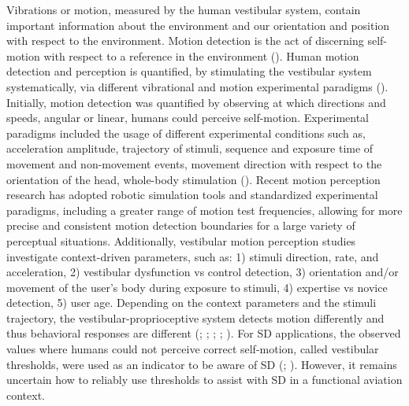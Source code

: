 \documentclass[11pt, onecolumn]{article}
\begin{document}
Vibrations or motion, measured by the human vestibular system, contain important information about the environment and our orientation and position with respect to the environment.  Motion detection is the act of discerning self-motion with respect to a reference in the environment (\cite{Chaudhuri_2013_Wholebody}).  Human motion detection and perception is quantified, by stimulating the vestibular system systematically, via different vibrational and motion experimental paradigms (\cite{Angelaki_2008_Vestibular}). Initially, motion detection was quantified by observing at which directions and speeds, angular or linear, humans could perceive self-motion.  Experimental paradigms included the usage of different experimental conditions such as, acceleration amplitude, trajectory of stimuli, sequence and exposure time of movement and non-movement events, movement direction with respect to the orientation of the head, whole-body stimulation (\cite{Melvill_1978_Vertical}).  Recent motion perception research has adopted robotic simulation tools and standardized experimental paradigms, including a greater range of motion test frequencies, allowing for more precise and consistent motion detection boundaries for a large variety of perceptual situations.  Additionally, vestibular motion perception studies investigate context-driven parameters, such as: 1) stimuli direction, rate, and acceleration, 2) vestibular dysfunction vs control detection, 3) orientation and/or movement of the user's body during exposure to stimuli, 4) expertise vs novice detection, 5) user age.  Depending on the context parameters and the stimuli trajectory, the vestibular-proprioceptive system detects motion differently and thus behavioral responses are different (\cite{Soyka_2011_Predicting}; \cite{Valko_2012_Vestibular}; \cite{Hartmann_2014_Direction}; \cite{BermudezRey_2016_Vestibular}; \cite{Karmali_2017_Multivariate}).  For SD applications, the observed values where humans could not perceive correct self-motion, called vestibular thresholds, were used as an indicator to be aware of SD (\cite{Gillingham_1993_Spatial}; \cite{Previc_2004_Spatial}).  However, it remains uncertain how to reliably use thresholds to assist with SD in a functional aviation context.
\end{document}
